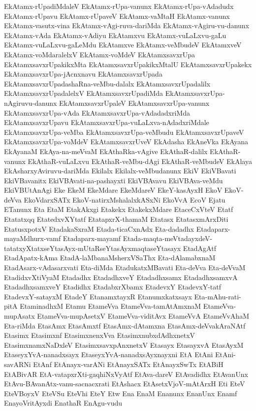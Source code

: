 {EkAtamx-rUpadiMdaleV
EkAtamx-rUpa-vanunx
EkAtamx-rUpa-vAdadudx
EkAtamx-rUpavu
EkAtamx-rUpaveV
EkAtamx-vaMtaH
EkAtamx-vanunx
EkAtamx-vasutx-vina
EkAtamx-vAgi-ruva-dariMda
EkAtamx-vAgiru-vu-danunx
EkAtamx-vAda
EkAtamx-vAdiyu
EkAtamxvu
EkAtamx-vuLaLxvu-gaLu
EkAtamx-vuLaLxvu-gaLeMdu
EkAtamxve
EkAtamx-veMbudeV
EkAtamxveV
EkAtamx-voMdaralelxV
EkAtamx-voMdeV
EkAtamxsavxrUpa
EkAtamxsavxrUpakikxMta
EkAtamxsavxrUpakikxMtalU
EkAtamxsavxrUpakekx
EkAtamxsavxrUpa-jAcnxnavu
EkAtamxsavxrUpada
EkAtamxsavxrUpadashaRna-veMbu-dalalx
EkAtamxsavxrUpadalilx
EkAtamxsavxrUpadalelxV
EkAtamxsavxrUpadiMda
EkAtamxsavxrUpa-nAgiruvu-danunx
EkAtamxsavxrUpaleV
EkAtamxsavxrUpa-vanunx
EkAtamxsavxrUpa-vAda
EkAtamxsavxrUpa-vAdadadxriMda
EkAtamxsavxrUpavu
EkAtamxsavxrUpa-vuLaLxva-nAdadxriMdale
EkAtamxsavxrUpa-veMba
EkAtamxsavxrUpa-veMbudu
EkAtamxsavxrUpaveV
EkAtamxsavxrUpa-voMdeV
EkAtamxsavxrUveV
EkAdasha
EkAneVka
EkAyana
EkAyanaM
EkAya-na-meVvaM
EkAthaRka-vAgive
EkAthaR-dalilx
EkAthaR-vanunx
EkAthaR-vuLaLxvu
EkAthaR-veMbu-dAgi
EkAthaR-veMbudeV
EkAlaya
EkAsharxyAviruvu-dariMda
Ekilalx
Ekilalx-veMbudanunx
EkiV
EkiVBavati
EkiVBavanitx
EkiVBAvati-na-pashayxti
EkiVBAvavu
EkiVBAva-veMdu
EkiVBUtAnAgi
Eke
EkeM
EkeMdare
EkeMdareV
EkeY-kasAyxH
EkoV
EkoV-deVva
EkoVdarxSATx
EkoV-natirxMshalalxkASxNi
EkoVvA
EcoV
Ejatu
ETanunx
Eta
EtaM
EtakAkxgi
Etakekx
EtakekxMdare
EtaceCxVteV
Etatf
Etatatxqq
EtatedxvXYtatf
EtatapxrX-thamaM
Etatasx
EtatasxmArxDiti
EtatusxpotxV
EtadakaSxraM
Etada-ticaCxnAdx
Eta-dadadhx
Etadaparx-mayaMdhurx-vamf
Etadaparx-mayamf
Etada-maqta-meVtadayxdeV-tatatxyXtatxseYtasAyx-mUtaRseYtasAyxmaqtaseYtasayx
EtadAgAtf
EtadApatx-kAma
EtadA-laMbanaMsherxVSaThx
Eta-dAlamabxnaM
EtadAsarx-vAdasarxvati
Eta-diMda
EtadukatxMBavati
Eta-deVva
Eta-deVvaM
EtadidxvXtiVyaM
Etadadhx
EtadadhxveY
Etadadhxsamx
EtadadhxsamxvA
EtadadhxsamxveY
Etadidhx
EtadabxrXbamx
EtadevxY
EtadevxY-tatf
EtadevxY-satayxM
EtadeY
EtanamxtayxR
Etanumxkatxsayx
Eta-mAhu-rati-pitA
EtaminadhxM
Etamu
EtameVva
EtameVva-tamAtAmxnaM
EtameVva-mupAsatx
EtameVva-mupAsetxV
EtameVva-viditAvx
EtameVvA
EtameVvAhaM
Eta-riMda
EtasAmx
EtasAmxtf
EtasAmx-dAtamxna
EtasAmx-deVvakAraNAtf
Etasimx
Etasimxnf
EtasimxnenxVva
EtasimxnubxdAdhxnetxV
EtasimxnamxNaDxleV
EtasimxsavxpAnxnetxV
Etasayx
EtasayxvA
EtasAyxM
EtaseyxYvA-nanadxsayx
EtaseyxYvA-nanadxsAyxnayxni
EtA
EtAni
EtAni-savARNi
EtAnf
EtAnayx-varANi
EtAnayxSATx
EtAnayxSwTx
EtABiH
EtABivAR
EtA-vatapxrXti-gaqhiNxVyAtf
EtAva-dareV
EtAvadidhx
EtAvanUnx
EtAvu-BAvanAtx-vanu-sacnacxrati
EtAshacx
EtAsetxVjoV-mAtArxH
Eti
EteV
EteVBoyxV
EteVSu
EteVhi
EteY
Etw
Ena
EnaM
Enanunx
EnanUnx
Enamf
EnayoVritAyxdi
EnathaR
EnAgu-vudu
}
